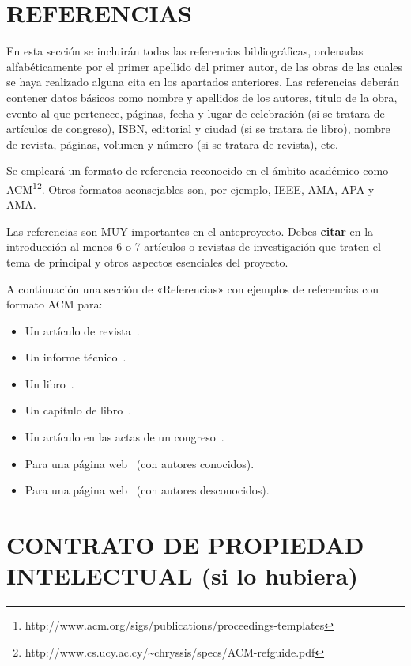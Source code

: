\documentclass{pre-tfg}
\begin{document}
\section{REFERENCIAS}

En esta sección se incluirán todas las referencias bibliográficas, ordenadas
alfabéticamente por el primer apellido del primer autor, de las obras de las cuales se
haya realizado alguna cita en los apartados anteriores. Las referencias deberán contener
datos básicos como nombre y apellidos de los autores, título de la obra, evento al que
pertenece, páginas, fecha y lugar de celebración (si se tratara de artículos de congreso),
ISBN, editorial y ciudad (si se tratara de libro), nombre de revista, páginas, volumen y
número (si se tratara de revista), etc.

Se empleará un formato de referencia reconocido en el ámbito académico como
ACM\footnote{http://www.acm.org/sigs/publications/proceedings-templates}\footnote{http://www.cs.ucy.ac.cy/\~{}chryssis/specs/ACM-refguide.pdf}.
Otros formatos aconsejables son, por ejemplo, IEEE, AMA, APA y AMA.

Las referencias son MUY importantes en el anteproyecto. Debes \textbf{citar} en la
introducción al menos 6 o 7 artículos o revistas de investigación que traten el tema de
principal y otros aspectos esenciales del proyecto.


A continuación una sección de «Referencias» con ejemplos de referencias con formato ACM para:

\begin{itemize}
\item Un artículo de revista~\cite{Bow93}.
\item Un informe técnico~\cite{Ding97}.
\item Un libro~\cite{Tavel07}.
\item Un capítulo de libro~\cite{Greiner99}.
\item Un artículo en las actas de un congreso~\cite{Frohlic00}.
\item Para una página web~\cite{Steele04} (con autores conocidos).
\item Para una página web~\cite{Oxygen} (con autores desconocidos).
\end{itemize}



\singlespacing


\section{CONTRATO DE PROPIEDAD INTELECTUAL (si lo hubiera)}
\end{document}
